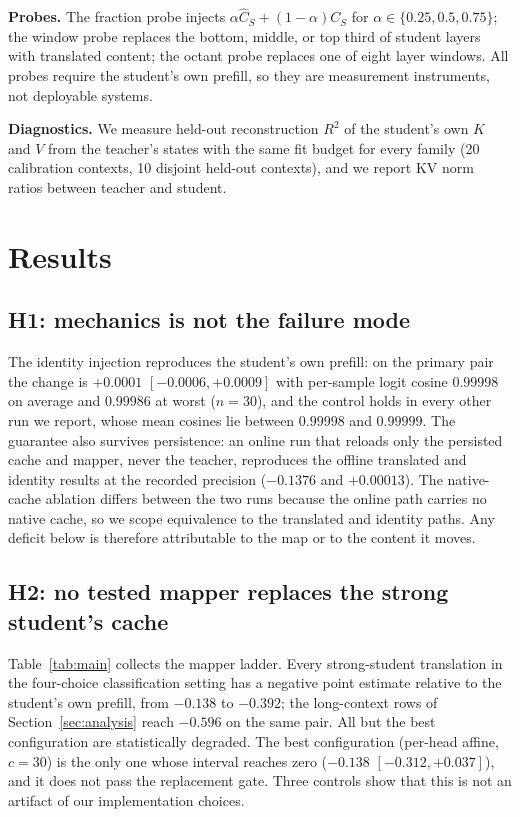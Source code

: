 \documentclass{article} %
\newcommand{\kv}{\ensuremath{\mathrm{KV}}}
\begin{document}
\textbf{Probes.} The fraction probe injects
$\alpha\widehat C_S+(1-\alpha)C_S$ for $\alpha\in\{0.25,0.5,0.75\}$; the window
probe replaces the bottom, middle, or top third of student layers with
translated content; the octant probe replaces one of eight layer windows. All
probes require the student's own prefill, so they are measurement instruments,
not deployable systems.

\textbf{Diagnostics.} We measure held-out reconstruction $R^2$ of the student's
own $K$ and $V$ from the teacher's states with the same fit budget for every
family (20 calibration contexts, 10 disjoint held-out contexts), and we report
\kv{} norm ratios between teacher and student.


\section{Results}
\label{sec:results}

\subsection{H1: mechanics is not the failure mode}
\label{sec:h1}
The identity injection reproduces the student's own prefill: on the primary pair
the change is $+0.0001$ $[-0.0006,+0.0009]$ with per-sample logit cosine $0.99998$
on average and $0.99986$ at worst ($n{=}30$), and the control holds in every
other run we report, whose mean cosines lie between $0.99998$ and $0.99999$.
The guarantee also survives persistence: an online run that
reloads only the persisted cache and mapper, never the teacher, reproduces the
offline translated and identity results at the recorded precision ($-0.1376$ and
$+0.00013$). The native-cache ablation differs between the two runs because the
online path carries no native cache, so we scope equivalence to the translated
and identity paths. Any deficit below is therefore attributable to the map or to
the content it moves.

\subsection{H2: no tested mapper replaces the strong student's cache}
\label{sec:h2}
Table~\ref{tab:main} collects the mapper ladder. Every strong-student
translation in the four-choice classification setting has a negative point
estimate relative to the student's own prefill, from $-0.138$ to $-0.392$; the
long-context rows of Section~\ref{sec:analysis} reach $-0.596$ on the same pair.
All but the best configuration are statistically degraded. The best configuration (per-head affine, $c{=}30$) is
the only one whose interval reaches zero ($-0.138$ $[-0.312,+0.037]$), and it does not
pass the replacement gate.
Three controls show that this is not an artifact of our implementation choices.
\end{document}
